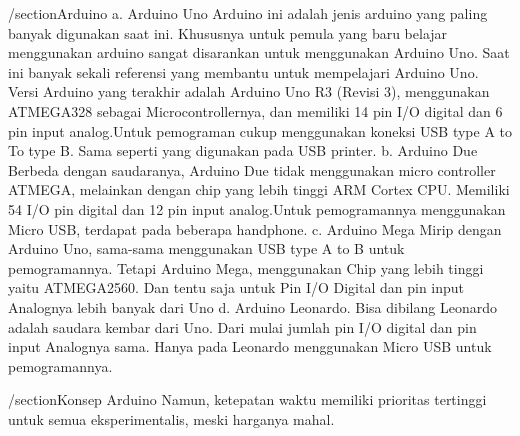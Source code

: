 /section{Arduino}
a. Arduino Uno
 Arduino ini adalah jenis arduino yang paling banyak digunakan saat ini. Khususnya untuk pemula yang baru belajar menggunakan arduino sangat disarankan untuk menggunakan Arduino Uno. Saat ini banyak sekali referensi yang membantu untuk mempelajari Arduino Uno. Versi Arduino yang terakhir adalah Arduino Uno R3 (Revisi 3), menggunakan ATMEGA328 sebagai Microcontrollernya, dan memiliki 14 pin I/O digital dan 6 pin input analog.Untuk pemograman cukup menggunakan koneksi USB type A to To type B. Sama seperti yang digunakan pada USB printer.
b. Arduino Due
Berbeda dengan saudaranya, Arduino Due tidak menggunakan micro controller ATMEGA, melainkan dengan chip yang lebih tinggi ARM Cortex CPU. Memiliki 54 I/O pin digital dan 12 pin input analog.Untuk pemogramannya menggunakan Micro USB, terdapat pada beberapa handphone.
c. Arduino Mega Mirip dengan Arduino Uno, sama-sama menggunakan USB type A to B untuk pemogramannya. Tetapi Arduino Mega, menggunakan Chip yang lebih tinggi yaitu ATMEGA2560. Dan tentu saja untuk Pin I/O Digital dan pin input Analognya lebih banyak dari Uno
d. Arduino Leonardo. Bisa dibilang Leonardo adalah saudara kembar dari Uno. Dari mulai jumlah pin I/O digital dan pin input Analognya sama. Hanya pada Leonardo menggunakan Micro USB untuk pemogramannya.

/section{Konsep Arduino}
Namun, ketepatan waktu memiliki prioritas tertinggi untuk semua eksperimentalis, meski harganya mahal.